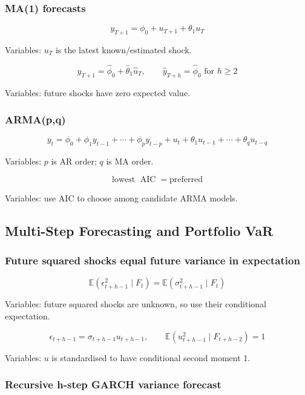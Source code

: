 \documentclass[
  8pt,
  twocolumn]{extarticle}
\begin{document}
\subsubsection{MA(1) forecasts}\label{ma1-forecasts}

\[
y_{T+1}=\phi_0+u_{T+1}+\theta_1u_T
\]

Variables: \(u_T\) is the latest known/estimated shock.

\[
\hat y_{T+1}=\hat\phi_0+\hat\theta_1\hat u_T,\qquad \hat y_{T+h}=\hat\phi_0\text{ for }h\ge2
\]

Variables: future shocks have zero expected value.

\subsubsection{ARMA(p,q)}\label{armapq}

\[
y_t=\phi_0+\phi_1y_{t-1}+\cdots+\phi_py_{t-p}+u_t+\theta_1u_{t-1}+\cdots+\theta_qu_{t-q}
\]

Variables: \(p\) is AR order; \(q\) is MA order.

\[
\text{lowest }\operatorname{AIC}=\text{preferred}
\]

Variables: use AIC to choose among candidate ARMA models.

\subsection{Multi-Step Forecasting and Portfolio
VaR}\label{multi-step-forecasting-and-portfolio-var}

\subsubsection{Future squared shocks equal future variance in
expectation}\label{future-squared-shocks-equal-future-variance-in-expectation}

\[
\mathbb E(\epsilon_{t+h-1}^2\mid F_t)=\mathbb E(\sigma_{t+h-1}^2\mid F_t)
\]

Variables: future squared shocks are unknown, so use their conditional
expectation.

\[
\epsilon_{t+h-1}=\sigma_{t+h-1}u_{t+h-1},\qquad \mathbb E(u_{t+h-1}^2\mid F_{t+h-2})=1
\]

Variables: \(u\) is standardised to have conditional second moment 1.

\subsubsection{Recursive h-step GARCH variance
forecast}\label{recursive-h-step-garch-variance-forecast}
\end{document}

